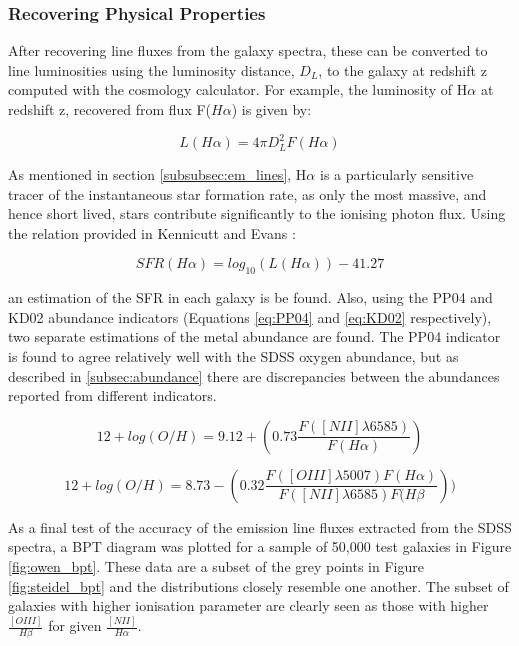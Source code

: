 \documentclass{literature}
\begin{document}
\subsubsection{Recovering Physical Properties}
After recovering line fluxes from the galaxy spectra, these can be converted to line luminosities using the luminosity distance, $D_{L}$, to the galaxy at redshift z computed with the cosmology calculator. For example, the luminosity of H$\alpha$ at redshift z, recovered from flux F($H\alpha$) is given by: 

\begin{equation}
\label{eq:flux-lum}
 	L(H\alpha) = 4\pi D_{L}^{2} F(H\alpha)
\end{equation} 

As mentioned in section \ref{subsubsec:em_lines}, H$\alpha$ is a particularly sensitive tracer of the instantaneous star formation rate, as only the most massive, and hence short lived, stars contribute significantly to the ionising photon flux. Using the relation provided in Kennicutt and Evans \citep{Kennicutt_2012}: 

\begin{equation}
 	\label{eq:halpha_sfr}
 	SFR(H\alpha) = log_{10}(L(H\alpha)) - 41.27
 \end{equation} 

an estimation of the SFR in each galaxy is be found. Also, using the PP04 \citep{Pettini_2004} and KD02 \citep{Kewley2002} abundance indicators (Equations \ref{eq:PP04} and \ref{eq:KD02} respectively), two separate estimations of the metal abundance are found. The PP04 indicator is found to agree relatively well with the SDSS oxygen abundance, but as described in \ref{subsec:abundance} there are discrepancies between the abundances reported from different indicators.  

\begin{equation}
	\label{eq:PP04}
	12 + log(O/H) = 9.12 + (0.73\frac{F([NII]\lambda 6585)}{F(H\alpha)})
\end{equation}

\begin{equation}
	\label{eq:KD02}
	12 + log(O/H) = 8.73 - (0.32\frac{F([OIII]\lambda 5007)F(H\alpha)}{F([NII]\lambda 6585)F(H\beta}))	
\end{equation}

As a final test of the accuracy of the emission line fluxes extracted from the SDSS spectra, a BPT diagram was plotted for a sample of 50,000 test galaxies in Figure \ref{fig:owen_bpt}. These data are a subset of the grey points in Figure \ref{fig:steidel_bpt} and the distributions closely resemble one another. The subset of galaxies with higher ionisation parameter are clearly seen as those with higher $\frac{[OIII]}{H\beta}$ for given $\frac{[NII]}{H\alpha}$.
\end{document}
